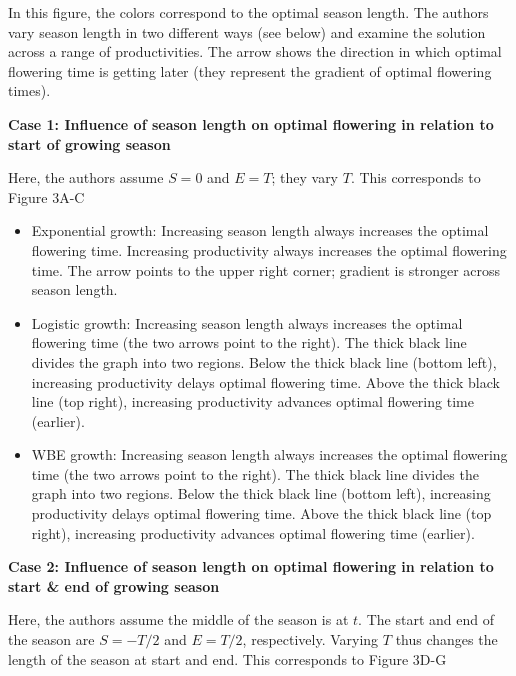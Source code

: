 \documentclass[12pt, oneside]{article}   	%
\begin{document}
In this figure, the colors correspond to the optimal season length. The authors vary season length in two different ways (see below) and examine the solution across a range of productivities. The arrow shows the direction in which optimal flowering time is getting later (they represent the gradient of optimal flowering times).

\textbf{Case 1: Influence of season length on optimal flowering in relation to start of growing season}

Here, the authors assume $S=0$ and $E=T$; they vary $T$. This corresponds to Figure 3A-C

\begin{itemize}
\item Exponential growth: Increasing season length always increases the optimal flowering time. Increasing productivity always increases the optimal flowering time. The arrow points to the upper right corner; gradient is stronger across season length.
\item Logistic growth: Increasing season length always increases the optimal flowering time (the two arrows point to the right). The thick black line divides the graph into two regions. Below the thick black line (bottom left), increasing productivity delays optimal flowering time. Above the thick black line (top right), increasing productivity advances optimal flowering time (earlier).
\item WBE growth: Increasing season length always increases the optimal flowering time (the two arrows point to the right). The thick black line divides the graph into two regions. Below the thick black line (bottom left), increasing productivity delays optimal flowering time. Above the thick black line (top right), increasing productivity advances optimal flowering time (earlier).
\end{itemize}

\textbf{Case 2: Influence of season length on optimal flowering in relation to start \& end of growing season}

Here, the authors assume the middle of the season is at $t$. The start and end of the season are $S=-T/2$ and $E=T/2$, respectively. Varying $T$ thus changes the length of the season at start and end. This corresponds to Figure 3D-G
\end{document}
